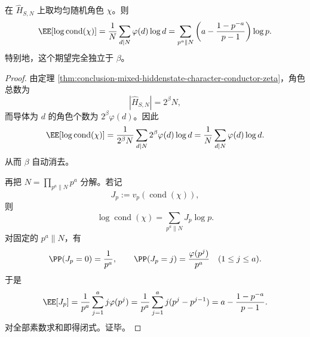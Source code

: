 \begin{corollary}[随机字符导体的精确对数期望]\label{cor:conclusion-mixed-hiddenstate-random-character-logconductor}
在 \(\widehat H_{S,N}\) 上取均匀随机角色 \(\chi\)。则
\[
\EE[\log \operatorname{cond}(\chi)]
=
\frac1N\sum_{d\mid N}\varphi(d)\log d
=
\sum_{p^a\parallel N}
\left(
a-\frac{1-p^{-a}}{p-1}
\right)\log p.
\]
特别地，这个期望完全独立于 \(\beta\)。
\end{corollary}
\begin{proof}
由定理 \ref{thm:conclusion-mixed-hiddenstate-character-conductor-zeta}，角色总数为
\[
|\widehat H_{S,N}|=2^\beta N,
\]
而导体为 \(d\) 的角色个数为 \(2^\beta\varphi(d)\)。因此
\[
\EE[\log \operatorname{cond}(\chi)]
=
\frac{1}{2^\beta N}\sum_{d\mid N}2^\beta\varphi(d)\log d
=
\frac1N\sum_{d\mid N}\varphi(d)\log d.
\]
从而 \(\beta\) 自动消去。

再把 \(N=\prod_{p^a\parallel N}p^a\) 分解。若记
\[
J_p:=v_p(\operatorname{cond}(\chi)),
\]
则
\[
\log\operatorname{cond}(\chi)=\sum_{p^a\parallel N}J_p\log p.
\]
对固定的 \(p^a\parallel N\)，有
\[
\PP(J_p=0)=\frac1{p^a},
\qquad
\PP(J_p=j)=\frac{\varphi(p^j)}{p^a}\quad(1\le j\le a).
\]
于是
\[
\EE[J_p]
=
\frac1{p^a}\sum_{j=1}^{a}j\varphi(p^j)
=
\frac1{p^a}\sum_{j=1}^{a}j(p^j-p^{j-1})
=
a-\frac{1-p^{-a}}{p-1}.
\]
对全部素数求和即得闭式。证毕。
\end{proof}

